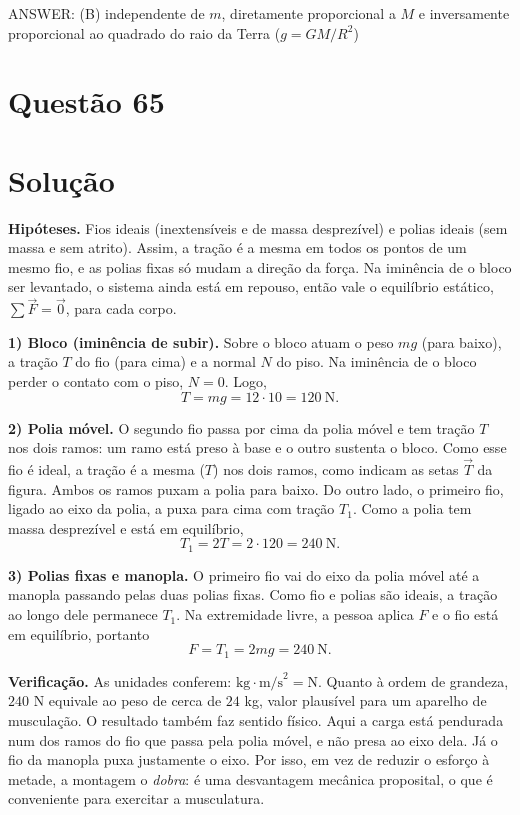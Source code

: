 \documentclass{article}%
\begin{document}
ANSWER: (B) independente de $m$, diretamente proporcional a $M$ e inversamente proporcional ao quadrado do raio da Terra ($g = GM/R^{2}$)%
\newpage%
\section*{Questão 65}

\section*{Solução}

\textbf{Hipóteses.} Fios ideais (inextensíveis e de massa desprezível) e polias ideais (sem massa e sem atrito). Assim, a tração é a mesma em todos os pontos de um mesmo fio, e as polias fixas só mudam a direção da força. Na iminência de o bloco ser levantado, o sistema ainda está em repouso, então vale o equilíbrio estático, $\sum \vec F = \vec 0$, para cada corpo.

\textbf{1) Bloco (iminência de subir).} Sobre o bloco atuam o peso $mg$ (para baixo), a tração $T$ do fio (para cima) e a normal $N$ do piso. Na iminência de o bloco perder o contato com o piso, $N = 0$. Logo,
\[
T = mg = 12 \cdot 10 = 120\ \text{N}.
\]

\textbf{2) Polia móvel.} O segundo fio passa por cima da polia móvel e tem tração $T$ nos dois ramos: um ramo está preso à base e o outro sustenta o bloco. Como esse fio é ideal, a tração é a mesma ($T$) nos dois ramos, como indicam as setas $\vec T$ da figura. Ambos os ramos puxam a polia para baixo. Do outro lado, o primeiro fio, ligado ao eixo da polia, a puxa para cima com tração $T_1$. Como a polia tem massa desprezível e está em equilíbrio,
\[
T_1 = 2T = 2 \cdot 120 = 240\ \text{N}.
\]

\textbf{3) Polias fixas e manopla.} O primeiro fio vai do eixo da polia móvel até a manopla passando pelas duas polias fixas. Como fio e polias são ideais, a tração ao longo dele permanece $T_1$. Na extremidade livre, a pessoa aplica $F$ e o fio está em equilíbrio, portanto
\[
F = T_1 = 2mg = 240\ \text{N}.
\]

\textbf{Verificação.} As unidades conferem: $\text{kg}\cdot\text{m/s}^2 = \text{N}$. Quanto à ordem de grandeza, $240$ N equivale ao peso de cerca de $24$ kg, valor plausível para um aparelho de musculação. O resultado também faz sentido físico. Aqui a carga está pendurada num dos ramos do fio que passa pela polia móvel, e não presa ao eixo dela. Já o fio da manopla puxa justamente o eixo. Por isso, em vez de reduzir o esforço à metade, a montagem o \emph{dobra}: é uma desvantagem mecânica proposital, o que é conveniente para exercitar a musculatura.
\end{document}
